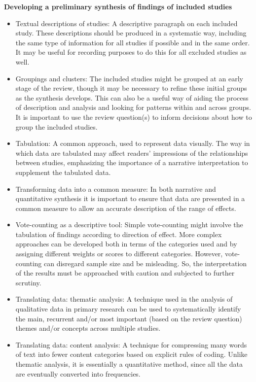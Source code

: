 \documentclass[
  11pt,
  a4paper,
  DIV=11,
  numbers=noendperiod]{scrreprt}
\begin{document}
\textbf{Developing a preliminary synthesis of findings of included
studies}

\begin{itemize}
\item
  Textual descriptions of studies: A descriptive paragraph on each
  included study. These descriptions should be produced in a systematic
  way, including the same type of information for all studies if
  possible and in the same order. It may be useful for recording
  purposes to do this for all excluded studies as well.
\item
  Groupings and clusters: The included studies might be grouped at an
  early stage of the review, though it may be necessary to refine these
  initial groups as the synthesis develops. This can also be a useful
  way of aiding the process of description and analysis and looking for
  patterns within and across groups. It is important to use the review
  question(s) to inform decisions about how to group the included
  studies.
\item
  Tabulation: A common approach, used to represent data visually. The
  way in which data are tabulated may affect readers' impressions of the
  relationships between studies, emphasizing the importance of a
  narrative interpretation to supplement the tabulated data.
\item
  Transforming data into a common measure: In both narrative and
  quantitative synthesis it is important to ensure that data are
  presented in a common measure to allow an accurate description of the
  range of effects.
\item
  Vote-counting as a descriptive tool: Simple vote-counting might
  involve the tabulation of findings according to direction of effect.
  More complex approaches can be developed both in terms of the
  categories used and by assigning different weights or scores to
  different categories. However, vote-counting can disregard sample size
  and be misleading. So, the interpretation of the results must be
  approached with caution and subjected to further scrutiny.
\item
  Translating data: thematic analysis: A technique used in the analysis
  of qualitative data in primary research can be used to systematically
  identify the main, recurrent and/or most important (based on the
  review question) themes and/or concepts across multiple studies.
\item
  Translating data: content analysis: A technique for compressing many
  words of text into fewer content categories based on explicit rules of
  coding. Unlike thematic analysis, it is essentially a quantitative
  method, since all the data are eventually converted into frequencies.
\end{itemize}
\end{document}
